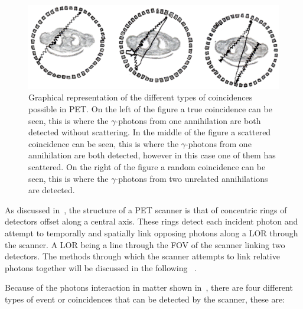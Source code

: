             \begin{figure}
                \centering
                
                \includegraphics[width=1.0\linewidth]{figures/background_coincidence.png}
                
                \captionsetup{singlelinecheck=false, justification=raggedright}
                \caption{Graphical representation of the different types of coincidences possible in \gls{PET}. On the left of the figure a true coincidence can be seen, this is where the $\gamma$-photons from one annihilation are both detected without scattering. In the middle of the figure a scattered coincidence can be seen, this is where the $\gamma$-photons from one annihilation are both detected, however in this case one of them has scattered. On the right of the figure a random coincidence can be seen, this is where the $\gamma$-photons from two unrelated annihilations are detected.} \label{fig:data_acquisition_coincidence}
            \end{figure}
            
            As discussed in~, the structure of a \gls{PET} scanner is that of concentric rings of detectors offset along a central axis. These rings detect each incident photon and attempt to temporally and spatially link opposing photons along a \gls{LOR} through the scanner. A \gls{LOR} being a line through the \gls{FOV} of the scanner linking two detectors. The methods through which the scanner attempts to %
            link relative photons together will be discussed in the following %
            ~.
            
            Because of the photons interaction in matter shown in~, there are four different types of event or coincidences that can be detected by the scanner, these are:
            
